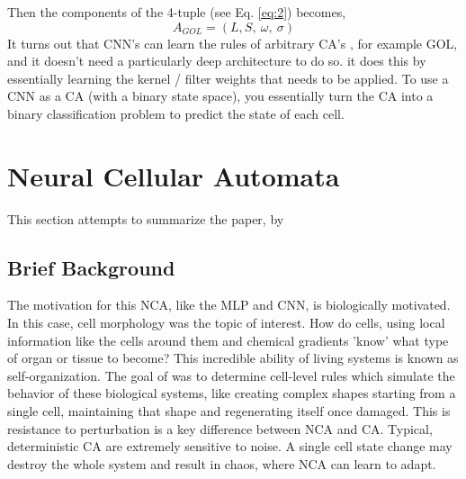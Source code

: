 Then the components of the 4-tuple (see Eq. \ref{eq:2}) becomes,
\begin{equation}
	\label{eq:2.4}
	A_{GOL} = (L, S, \ \omega , \ \sigma )
\end{equation}
It turns out that CNN's can learn the rules of arbitrary CA's \cite{PhysRevE}, for example GOL, and it doesn't need a particularly deep architecture to do so. it does this by essentially learning the kernel / filter weights that needs to be applied. To use a CNN as a CA (with a binary state space), you essentially turn the CA into a binary classification problem to predict the state of each cell.

\section{Neural Cellular Automata}

This section attempts to summarize the paper,  by \citeauthor{growing_nca} \cite{growing_nca}
\subsection{Brief Background}

The motivation for this NCA, like the MLP and CNN, is biologically motivated. In this case, cell morphology was the topic of interest. How do cells, using local information like the cells around them and chemical gradients 'know' what type of organ or tissue to become? This incredible ability of living systems is known as self-organization. The goal of \citeauthor{growing_nca} was to determine cell-level rules which simulate the behavior of these biological systems, like creating complex shapes  starting from a single cell, maintaining that shape and regenerating itself once damaged. This is resistance to perturbation is a key difference between NCA and CA. Typical, deterministic CA are extremely sensitive to noise. A single cell state change may destroy the whole system and result in chaos, where NCA can learn to adapt.


